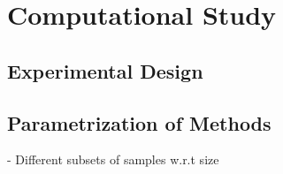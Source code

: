 \chapter{Computational Study}

\section{Experimental Design}
\section{Parametrization of Methods}
- Different subsets of samples w.r.t size
